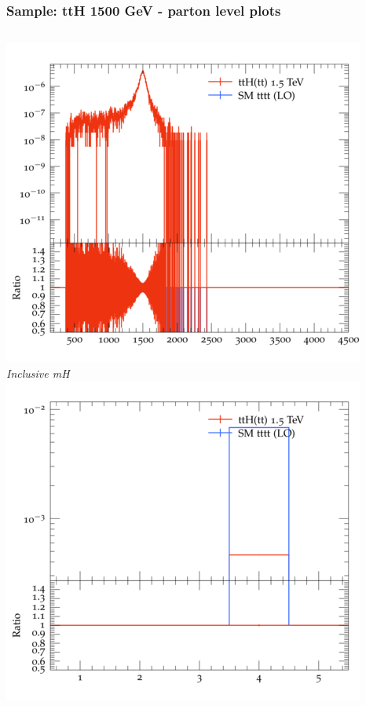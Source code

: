 \documentclass{beamer}
\begin{document}
\begin{frame}
\frametitle{Sample: ttH 1500 GeV - parton level plots}
\begin{columns}
\includegraphics[width=\textwidth]{../plots/ttH_1500/tttt_ttH/Inclusive_mH.png}\\
\textit{\small Inclusive mH}
\includegraphics[width=\textwidth]{../plots/ttH_1500/tttt_ttH/Inclusive_nTop.png}\\

\end{columns}
\end{frame}
\end{document}
